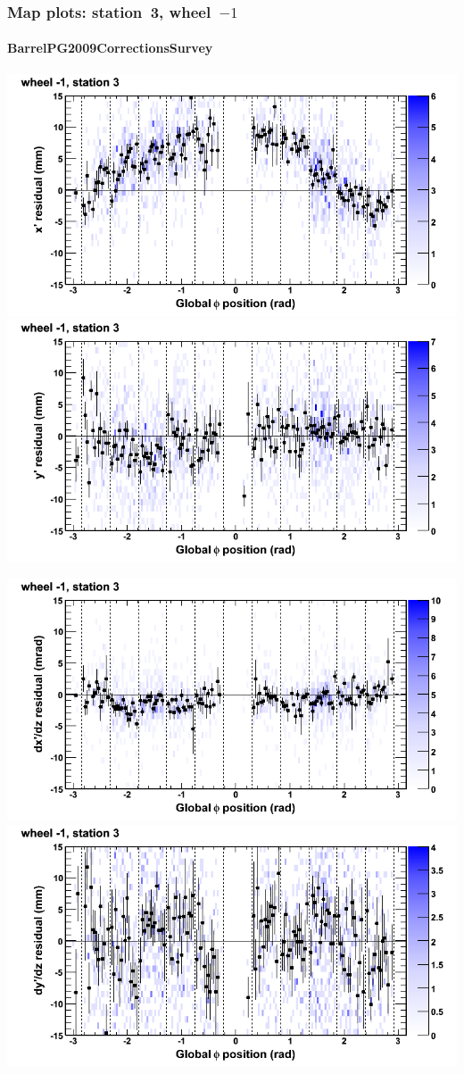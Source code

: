 \documentclass[compress]{beamer}
\begin{document}
\begin{frame}
\frametitle{Map plots: station~3, wheel~$-1$}
\framesubtitle{BarrelPG2009CorrectionsSurvey}
\includegraphics[width=0.5\linewidth]{mapplots_01/DTvsphi_st3whB_x.png}
\includegraphics[width=0.5\linewidth]{mapplots_01/DTvsphi_st3whB_y.png}

\includegraphics[width=0.5\linewidth]{mapplots_01/DTvsphi_st3whB_dxdz.png}
\includegraphics[width=0.5\linewidth]{mapplots_01/DTvsphi_st3whB_dydz.png}
\end{frame}
\end{document}
